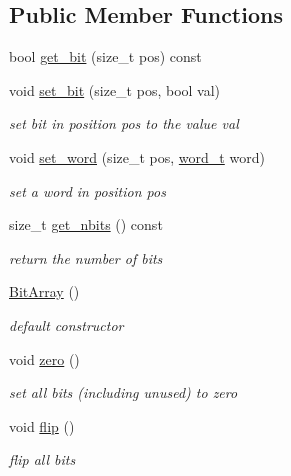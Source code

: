 \subsection*{Public Member Functions}
\begin{DoxyCompactItemize}
\item 
bool \mbox{\hyperlink{classforte_1_1_bit_array_a6763512d765e8dbd07d7f70ed3bb1950}{get\+\_\+bit}} (size\+\_\+t pos) const
\item 
void \mbox{\hyperlink{classforte_1_1_bit_array_aded6c5518708c6433bba8c7b9115199d}{set\+\_\+bit}} (size\+\_\+t pos, bool val)
\begin{DoxyCompactList}\small\item\em set bit in position pos to the value val \end{DoxyCompactList}\item 
void \mbox{\hyperlink{classforte_1_1_bit_array_a52623739054020b7da6ffab1cacf033e}{set\+\_\+word}} (size\+\_\+t pos, \mbox{\hyperlink{classforte_1_1_bit_array_a7f3b4ebbbe4bc80ce60cc6614cb565da}{word\+\_\+t}} word)
\begin{DoxyCompactList}\small\item\em set a word in position pos \end{DoxyCompactList}\item 
size\+\_\+t \mbox{\hyperlink{classforte_1_1_bit_array_a2adc17f21cc178cf6450d74e5629884d}{get\+\_\+nbits}} () const
\begin{DoxyCompactList}\small\item\em return the number of bits \end{DoxyCompactList}\item 
\mbox{\hyperlink{classforte_1_1_bit_array_a3cdd02168872c1fc32ca3999207e3b38}{Bit\+Array}} ()
\begin{DoxyCompactList}\small\item\em default constructor \end{DoxyCompactList}\item 
void \mbox{\hyperlink{classforte_1_1_bit_array_ab9e015d5e061725d21562ce068dc3dbb}{zero}} ()
\begin{DoxyCompactList}\small\item\em set all bits (including unused) to zero \end{DoxyCompactList}\item 
void \mbox{\hyperlink{classforte_1_1_bit_array_ae6c9b2e2ddeaff0df89bc96f27625eb6}{flip}} ()
\begin{DoxyCompactList}\small\item\em flip all bits \end{DoxyCompactList}\item 

\end{DoxyCompactItemize}
